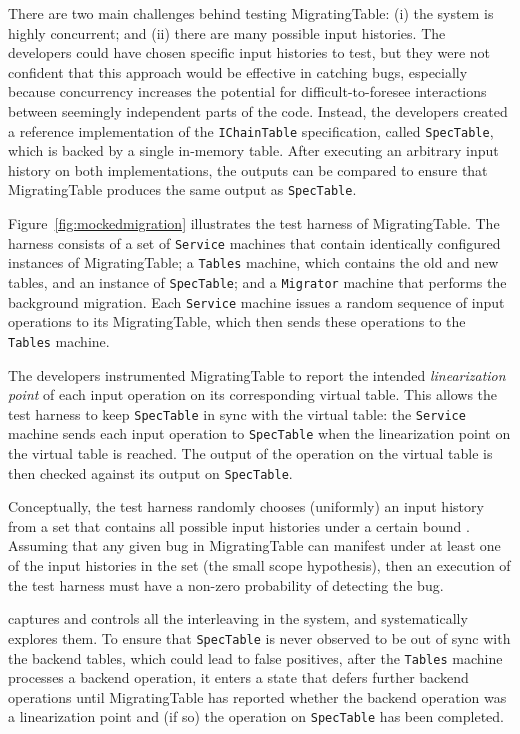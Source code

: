 There are two main challenges behind testing MigratingTable: (i) the system is highly concurrent; and (ii) there are many possible input histories. The developers could have chosen specific input histories to test, but they were not confident that this approach would be effective in catching bugs, especially because concurrency increases the potential for difficult-to-foresee interactions between seemingly independent parts of the code. Instead, the developers created a reference implementation of the \texttt{IChainTable} specification, called \texttt{SpecTable}, which is backed by a single in-memory table. After executing an arbitrary input history on both implementations, the outputs can be compared to ensure that MigratingTable produces the same output as \texttt{SpecTable}.

Figure~\ref{fig:mockedmigration} illustrates the \psharp test harness of MigratingTable. The harness consists of a set of \texttt{Service} machines that contain identically configured instances of MigratingTable; a \texttt{Tables} machine, which contains the old and new tables, and an instance of \texttt{SpecTable}; and a \texttt{Migrator} machine that performs the background migration. Each \texttt{Service} machine issues a random sequence of input operations to its MigratingTable, which then sends these operations to the \texttt{Tables} machine.

The developers instrumented MigratingTable to report the intended \emph{linearization point} of each input operation on its corresponding virtual table. This allows the \psharp test harness to keep \texttt{SpecTable} in sync with the virtual table: the \texttt{Service} machine sends each input operation to \texttt{SpecTable} when the linearization point on the virtual table is reached. The output of the operation on the virtual table is then checked against its output on \texttt{SpecTable}.

Conceptually, the \psharp test harness randomly chooses (uniformly) an input history from a set that contains all possible input histories under a certain bound . Assuming that any given bug in MigratingTable can manifest under at least one of the input histories in the set (the small scope hypothesis), then an execution of the test harness must have a non-zero probability of detecting the bug.

\psharp captures and controls all the interleaving in the system, and systematically explores them. To ensure that \texttt{SpecTable} is never observed to be out of sync with the backend tables, which could lead to false positives, after the \texttt{Tables} machine processes a backend operation, it enters a state that defers further backend operations until MigratingTable has reported whether the backend operation was a linearization point and (if so) the operation on \texttt{SpecTable} has been completed.

